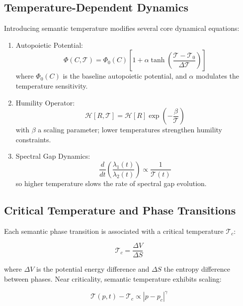 \subsection{Temperature-Dependent Dynamics}

Introducing semantic temperature modifies several core dynamical equations:

\begin{enumerate}
    \item Autopoietic Potential:
    \begin{equation}
    \Phi(C, \mathcal{T}) = \Phi_0(C) \left[1 + \alpha \tanh\left(\frac{\mathcal{T} - \mathcal{T}_0}{\Delta \mathcal{T}}\right)\right]
    \end{equation}
    where \(\Phi_0(C)\) is the baseline autopoietic potential, and \(\alpha\) modulates the temperature sensitivity.

    \item Humility Operator:
    \begin{equation}
    \mathcal{H}[R, \mathcal{T}] = \mathcal{H}[R] \exp\left(-\frac{\beta}{\mathcal{T}}\right)
    \end{equation}
    with \(\beta\) a scaling parameter; lower temperatures strengthen humility constraints.

    \item Spectral Gap Dynamics:
    \begin{equation}
    \frac{d}{dt}\left(\frac{\lambda_1(t)}{\lambda_2(t)}\right) \propto \frac{1}{\mathcal{T}(t)}
    \end{equation}
    so higher temperature slows the rate of spectral gap evolution.
\end{enumerate}

\subsection{Critical Temperature and Phase Transitions}

Each semantic phase transition is associated with a critical temperature \(\mathcal{T}_c\):

\begin{equation}
\mathcal{T}_c = \frac{\Delta V}{\Delta S}
\end{equation}

where \(\Delta V\) is the potential energy difference and \(\Delta S\) the entropy difference between phases. Near criticality, semantic temperature exhibits scaling:

\begin{equation}
\mathcal{T}(p,t) - \mathcal{T}_c \propto |p - p_c|^{\gamma}
\end{equation}

